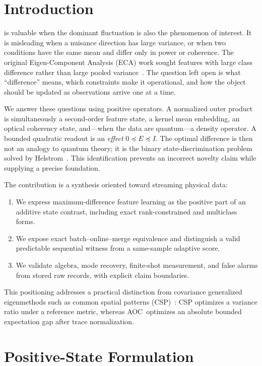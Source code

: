 \documentclass[letterpaper,journal]{IEEEtran}
\newcommand{\AOC}{\textsc{AOC}}
\begin{document}
\section{Introduction}

 is valuable when the dominant fluctuation is also
the phenomenon of interest. It is misleading when a nuisance direction has
large variance, or when two conditions have the same mean and differ only in
power or coherence. The original Eigen-Component Analysis (ECA) work sought
features with large class difference rather than large pooled
variance~\cite{chen2025eca}. The question left open is what ``difference''
means, which constraints make it operational, and how the object should be
updated as observations arrive one at a time.

We answer these questions using positive operators. A normalized outer
product is simultaneously a second-order feature state, a kernel mean
embedding, an optical coherency state, and---when the data are quantum---a
density operator. A bounded quadratic readout is an \emph{effect}
$0\preceq E\preceq I$. The optimal difference is then not an analogy to
quantum theory; it is the binary state-discrimination problem solved by
Helstrom~\cite{helstrom1976,holevo2011}. This identification prevents an
incorrect novelty claim while supplying a precise foundation.

The contribution is a synthesis oriented toward streaming physical data:

\begin{enumerate}
\item We express maximum-difference feature learning as the positive part of
an additive state contrast, including exact rank-constrained and multiclass
forms.
\item We expose exact batch--online--merge equivalence and distinguish a valid
predictable sequential witness from a same-sample adaptive score.
\item We validate algebra, mode recovery, finite-shot measurement, and false
alarms from stored raw records, with explicit claim boundaries.
\end{enumerate}

This positioning addresses a practical distinction from covariance
generalized eigenmethods such as common spatial patterns (CSP)~\cite{parra2003}:
CSP optimizes a variance ratio under a reference metric, whereas \AOC\
optimizes an absolute bounded expectation gap after trace normalization.

\section{Positive-State Formulation}
\end{document}
